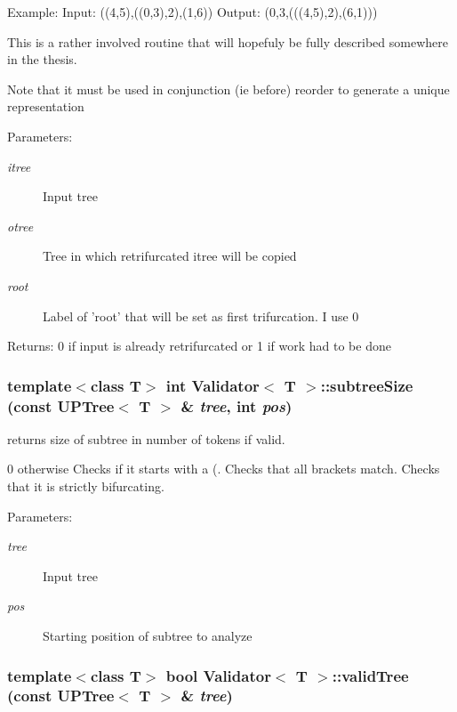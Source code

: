 Example: Input: ((4,5),((0,3),2),(1,6)) Output: (0,3,(((4,5),2),(6,1)))

This is a rather involved routine that will hopefuly be fully described somewhere in the thesis.

Note that it must be used in conjunction (ie before) reorder to generate a unique representation \begin{Desc}
\item[Parameters:]
\begin{description}
\item[{\em itree}]Input tree \item[{\em otree}]Tree in which retrifurcated itree will be copied \item[{\em root}]Label of 'root' that will be set as first trifurcation. I use 0 \end{description}
\end{Desc}
\begin{Desc}
\item[Returns:]0 if input is already retrifurcated or 1 if work had to be done \end{Desc}
\subsubsection{\setlength{\rightskip}{0pt plus 5cm}template$<$class T$>$ int {\bf Validator}$<$ T $>$::subtree\-Size (const {\bf UPTree}$<$ T $>$ \& {\em tree}, int {\em pos})}\label{classValidator_a3}


returns size of subtree in number of tokens if valid. 

0 otherwise Checks if it starts with a (. Checks that all brackets match. Checks that it is strictly bifurcating. \begin{Desc}
\item[Parameters:]
\begin{description}
\item[{\em tree}]Input tree \item[{\em pos}]Starting position of subtree to analyze \end{description}
\end{Desc}
\subsubsection{\setlength{\rightskip}{0pt plus 5cm}template$<$class T$>$ bool {\bf Validator}$<$ T $>$::valid\-Tree (const {\bf UPTree}$<$ T $>$ \& {\em tree})}\label{classValidator_a2}


